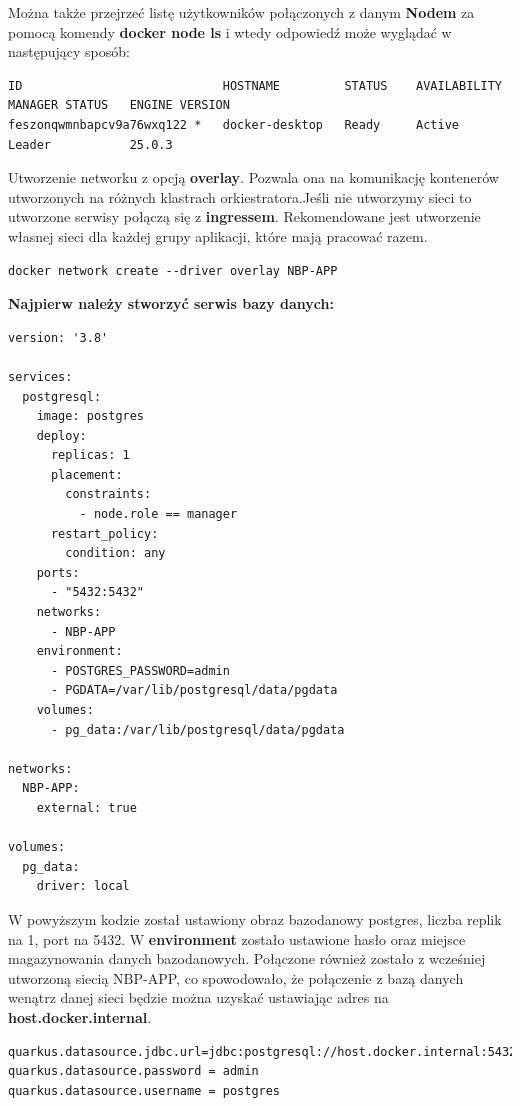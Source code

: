 \documentclass{iiuwb}
\begin{document}
Można także przejrzeć listę użytkowników połączonych z danym \textbf{Nodem}
za pomocą komendy \textbf{docker node ls} i wtedy odpowiedź może wyglądać 
w następujący sposób:

\begin{lstlisting}[breaklines=true]
ID                            HOSTNAME         STATUS    AVAILABILITY   MANAGER STATUS   ENGINE VERSION
feszonqwmnbapcv9a76wxq122 *   docker-desktop   Ready     Active         Leader           25.0.3  
\end{lstlisting}

Utworzenie networku z opcją \textbf{overlay}. Pozwala ona 
na komunikację kontenerów utworzonych na różnych klastrach
orkiestratora.Jeśli nie utworzymy sieci to utworzone serwisy połączą się z \textbf{ingressem}. 
Rekomendowane jest utworzenie własnej sieci dla każdej grupy aplikacji,
które mają pracować razem. 

\begin{lstlisting}[breaklines=true]
docker network create --driver overlay NBP-APP
\end{lstlisting}

\textbf{Najpierw należy stworzyć serwis bazy danych:}

\begin{lstlisting}[breaklines=true]
version: '3.8'

services:
  postgresql:
    image: postgres
    deploy:
      replicas: 1
      placement:
        constraints:
          - node.role == manager
      restart_policy:
        condition: any
    ports:
      - "5432:5432"
    networks:
      - NBP-APP
    environment:
      - POSTGRES_PASSWORD=admin
      - PGDATA=/var/lib/postgresql/data/pgdata
    volumes:
      - pg_data:/var/lib/postgresql/data/pgdata

networks:
  NBP-APP:
    external: true

volumes:
  pg_data:
    driver: local
\end{lstlisting}

W powyższym kodzie został ustawiony obraz bazodanowy postgres, 
liczba replik na 1, port na 5432. W \textbf{environment} zostało 
ustawione hasło oraz miejsce magazynowania danych bazodanowych. 
Połączone również zostało z wcześniej utworzoną siecią NBP-APP, 
co spowodowało, że połączenie z bazą danych wenątrz danej sieci
będzie można uzyskać ustawiając adres na \textbf{host.docker.internal}.

\begin{lstlisting}[breaklines=true]
quarkus.datasource.jdbc.url=jdbc:postgresql://host.docker.internal:5432/postgres
quarkus.datasource.password = admin
quarkus.datasource.username = postgres
\end{lstlisting}
\end{document}
